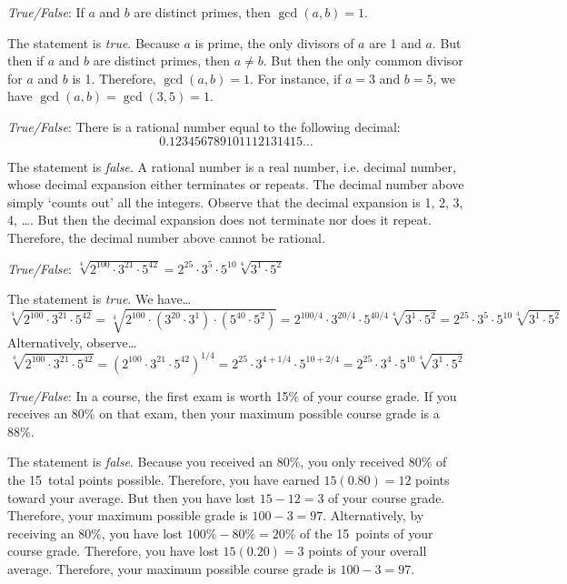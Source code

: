 \documentclass[11pt,letterpaper]{article}
\begin{document}
\thispagestyle{title}

\quizsol \textit{True/False}: If $a$ and $b$ are distinct primes, then $\gcd(a, b)= 1$. \pspace

\sol The statement is \textit{true}. Because $a$ is prime, the only divisors of $a$ are 1 and $a$. But then if $a$ and $b$ are distinct primes, then $a \neq b$. But then the only common divisor for $a$ and $b$ is 1. Therefore, $\gcd(a, b)= 1$. For instance, if $a= 3$ and $b= 5$, we have $\gcd(a, b)= \gcd(3, 5)= 1$. \pvspace{1.3cm}



\quizsol \textit{True/False}: There is a rational number equal to the following decimal:
	\[
	0.123456789101112131415\ldots
	\]

\sol The statement is \textit{false}. A rational number is a real number, i.e. decimal number, whose decimal expansion either terminates or repeats. The decimal number above simply `counts out' all the integers. Observe that the decimal expansion is 1, 2, 3, 4, \dots. But then the decimal expansion does not terminate nor does it repeat. Therefore, the decimal number above cannot be rational. \pvspace{1.3cm}



\quizsol \textit{True/False}: $\sqrt[4]{2^{100} \cdot 3^{21} \cdot 5^{42}}= 2^{25} \cdot 3^5 \cdot 5^{10} \sqrt[4]{3^1 \cdot 5^2}$ \pspace

\sol The statement is \textit{true}. We have\dots
	\[
	\sqrt[4]{2^{100} \cdot 3^{21} \cdot 5^{42}}= \sqrt[4]{2^{100} \cdot (3^{20} \cdot 3^1) \cdot (5^{40} \cdot 5^2)}= 2^{100/4} \cdot 3^{20/4} \cdot 5^{40/4} \sqrt[4]{3^1 \cdot 5^2}= 2^{25} \cdot 3^5 \cdot 5^{10} \sqrt[4]{3^1 \cdot 5^2}
	\]
Alternatively, observe\dots
	\[
	\sqrt[4]{2^{100} \cdot 3^{21} \cdot 5^{42}}= (2^{100} \cdot 3^{21} \cdot 5^{42})^{1/4}= 2^{25} \cdot 3^{4 + 1/4} \cdot 5^{10 + 2/4}= 2^{25} \cdot 3^4 \cdot 5^{10} \sqrt[4]{3^1 \cdot 5^2}
	\] \pvspace{1.3cm}



\quizsol \textit{True/False}: In a course, the first exam is worth 15\% of your course grade. If you receives an 80\% on that exam, then your maximum possible course grade is a 88\%. \pspace

\sol The statement is \textit{false}. Because you received an 80\%, you only received 80\% of the 15~total points possible. Therefore, you have earned $15(0.80)= 12$ points toward your average. But then you have lost $15 - 12= 3$ of your course grade. Therefore, your maximum possible grade is $100 - 3= 97$. Alternatively, by receiving an 80\%, you have lost $100\% - 80\%= 20\%$ of the 15~points of your course grade. Therefore, you have lost $15(0.20)= 3$ points of your overall average. Therefore, your maximum possible course grade is $100 - 3= 97$. \pvspace{1.3cm}
\end{document}
